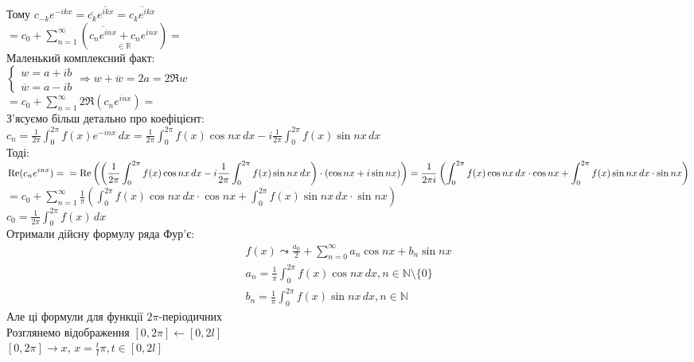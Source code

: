 \documentclass[a4paper, 14pt]{extarticle}
\def\hugespace{\vspace{5mm} \\}
\begin{document}
Тому $c_{-k}e^{-ikx} = \overline{c_k} \overline{e^{ikx}} = \overline{c_k e^{ikx}}$\\
$\displaystyle \boxed{=} c_0 + \sum_{n=1}^{\infty} \left( \underset{\in \mathbb{R}}{\overline{c_n e^{inx}} + c_n e^{inx}} \right) \boxed{=}$\\
Маленький комплексний факт:\\
$\begin{cases}
w = a + ib\\
\overline{w} = a - ib
\end{cases} \Rightarrow w + \overline{w} = 2a = 2\Re w
$\\
$\displaystyle \boxed{=} c_0 + \sum_{n=1}^{\infty} 2 \Re(c_n e^{inx}) \boxed{\boxed{=}}$\\
З'ясуємо більш детально про коефіцієнт:\\
$\displaystyle c_n = \frac{1}{2\pi}\int_0^{2\pi} f(x)e^{-inx}\,dx = \frac{1}{2 \pi} \int_0^{2\pi} f(x) \cos nx \,dx - i \frac{1}{2 \pi} \int_0^{2\pi} f(x) \sin nx \,dx$\\
Тоді:\\
$\displaystyle \Re (c_n e^{inx}) = \\ = \Re\left(\left(\frac{1}{2 \pi} \int_0^{2\pi} f(x) \cos nx \,dx - i \frac{1}{2 \pi} \int_0^{2\pi} f(x) \sin nx \,dx \right) \cdot \left(\cos nx + i \sin nx \right)\right) = \frac{1}{2 \pi i} \left(\int_0^{2 \pi} f(x) \cos nx \,dx \cdot \cos nx + \int_0^{2 \pi} f(x) \sin nx \,dx \cdot \sin nx \right)$\\
$\displaystyle \boxed{\boxed{=}} c_0 + \sum_{n=1}^{\infty} \frac{1}{\pi} \left(\int_0^{2 \pi} f(x) \cos nx \,dx \cdot \cos nx + \int_0^{2 \pi} f(x) \sin nx \,dx \cdot \sin nx \right)$\\
$\displaystyle c_0 = \frac{1}{2 \pi} \int_{0}^{2 \pi} f(x)\,dx$\\
Отримали дійсну формулу ряда Фур'є:
\begin{align*}
f(x) \leadsto \frac{a_0}{2} + \sum_{n=0}^{\infty} a_n \cos nx + b_n \sin nx \\
a_n = \frac{1}{\pi}\int_0^{2\pi} f(x) \cos nx \,dx, n \in \mathbb{N} \setminus \{0\} \\
b_n = \frac{1}{\pi}\int_0^{2\pi} f(x) \sin nx \,dx, n \in \mathbb{N}
\end{align*}
Але ці формули для функції $2\pi$-періодичних
\hugespace
Розглянемо відображення $[0, 2\pi] \leftarrow [0, 2l]$\\
$[0, 2\pi] \rightarrow x$, $\displaystyle x = \frac{t}{l}\pi, t \in [0,2l]$\\
\end{document}
